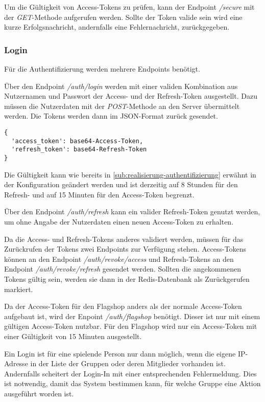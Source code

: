 Um die Gültigkeit von Access-Tokens zu prüfen, kann der Endpoint \textit{/secure} mit der \textit{GET}-Methode aufgerufen werden. Sollte der Token valide sein wird eine kurze Erfolgsnachricht, andernfalls eine Fehlernachricht, zurückgegeben.

\subsubsection{Login}
Für die Authentifizierung werden mehrere Endpoints benötigt.

Über den Endpoint \textit{/auth/login} werden mit einer validen Kombination aus Nutzernamen und Passwort der Access- und der Refresh-Token ausgestellt. Dazu müssen die Nutzerdaten mit der \textit{POST}-Methode an den Server übermittelt werden. Die Tokens werden dann im JSON-Format zurück gesendet.

\begin{lstlisting}[frame=single, caption={GIS Access- und Refresh-Token}, captionpos=b, label={lst:gis-login-tokens}]
{
  'access_token': base64-Access-Token,
  'refresh_token': base64-Refresh-Token
}

\end{lstlisting}

Die Gültigkeit kann wie bereits in \autoref{sub:realisierung-authentifizierung} erwähnt in der Konfiguration geändert werden und ist derzeitig auf 8 Stunden für den Refresh- und auf 15 Minuten für den Access-Token begrenzt.

Über den Endpoint \textit{/auth/refresh} kann ein valider Refresh-Token genutzt werden, um ohne Angabe der Nutzerdaten einen neuen Access-Token zu erhalten.

Da die Access- und Refresh-Tokens anderes validiert werden, müssen für das Zurückrufen der Tokens zwei Endpoints zur Verfügung stehen. Access-Tokens können an den Endpoint \textit{/auth/revoke/access} und Refresh-Tokens an den Endpoint \textit{/auth/revoke/refresh} gesendet werden. Sollten die angekommenen Tokens gültig sein, werden sie dann in der Redis-Datenbank als Zurückgerufen markiert.

Da der Access-Token für den Flagshop anders als der normale Access-Token aufgebaut ist, wird der Enpoint \textit{/auth/flagshop} benötigt. Dieser ist nur mit einem gültigen  Access-Token nutzbar. Für den Flagshop wird nur ein Access-Token mit einer Gültigkeit von 15 Minuten ausgestellt.

Ein Login ist für eine spielende Person nur dann möglich, wenn die eigene IP-Adresse in der Liste der Gruppen oder deren Mitglieder vorhanden ist. Andernfalls scheitert der Login-In mit einer entsprechenden Fehlermeldung. Dies ist notwendig, damit das System bestimmen kann, für welche Gruppe eine Aktion ausgeführt worden ist.

